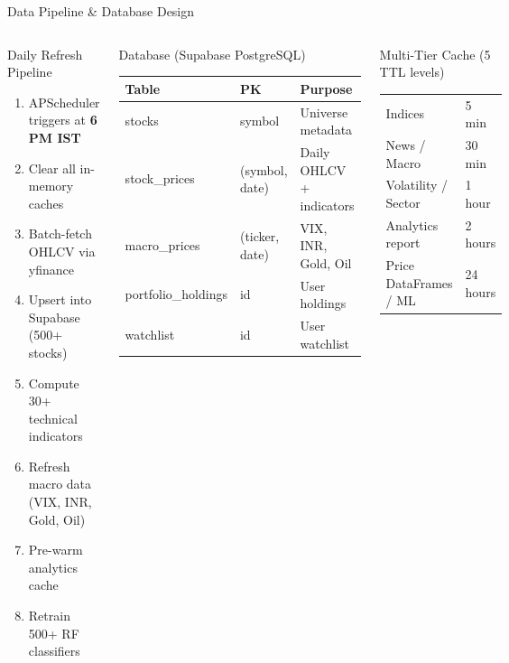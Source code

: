 \documentclass[aspectratio=169, 11pt]{beamer}
\begin{document}
\begin{frame}{Data Pipeline \& Database Design}
\begin{columns}[T]
\begin{block}{Daily Refresh Pipeline}
\small
\begin{enumerate}
  \item APScheduler triggers at \textbf{6 PM IST}
  \item Clear all in-memory caches
  \item Batch-fetch OHLCV via yfinance
  \item Upsert into Supabase (500+ stocks)
  \item Compute 30+ technical indicators
  \item Refresh macro data (VIX, INR, Gold, Oil)
  \item Pre-warm analytics cache
  \item Retrain 500+ RF classifiers
\end{enumerate}
\end{block}

\begin{block}{Database (Supabase PostgreSQL)}
\footnotesize
\renewcommand{\arraystretch}{1.2}
\begin{tabular}{@{}l l l@{}}
  \toprule
  \textbf{Table} & \textbf{PK} & \textbf{Purpose} \\
  \midrule
  stocks & symbol & Universe metadata \\
  stock\_prices & (symbol, date) & Daily OHLCV + indicators \\
  macro\_prices & (ticker, date) & VIX, INR, Gold, Oil \\
  portfolio\_holdings & id & User holdings \\
  watchlist & id & User watchlist \\
  \bottomrule
\end{tabular}
\end{block}

\vspace{0.2cm}
\begin{block}{Multi-Tier Cache (5 TTL levels)}
\footnotesize
\begin{tabular}{@{}l l@{}}
  Indices & 5 min \\
  News / Macro & 30 min \\
  Volatility / Sector & 1 hour \\
  Analytics report & 2 hours \\
  Price DataFrames / ML & 24 hours \\
\end{tabular}
\end{block}
\end{columns}
\end{frame}
\end{document}

